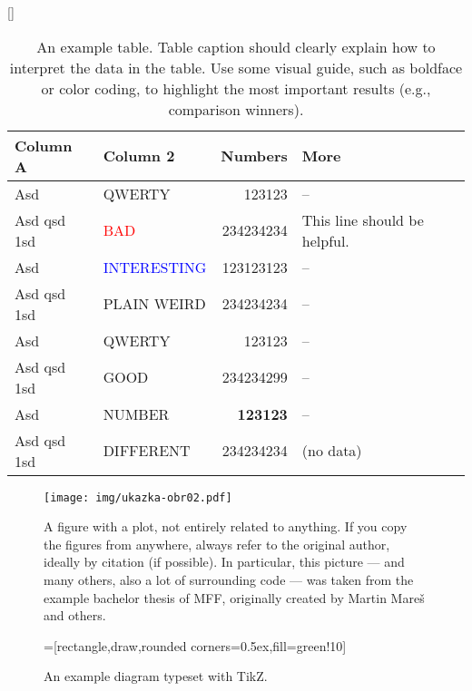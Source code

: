 \begin{table}
[\FBwidth]
{\centering\footnotesize\sf
\begin{tabular}{llrl}
\toprule
Column A & Column 2 & Numbers & More \\
\midrule
Asd & QWERTY & 123123 & -- \\
Asd qsd 1sd & \textcolor{red}{BAD} & 234234234 & This line should be helpful. \\
Asd & \textcolor{blue}{INTERESTING} & 123123123 & -- \\
Asd qsd 1sd & \textcolor{violet!50}{PLAIN WEIRD} & 234234234 & -- \\
Asd & QWERTY & 123123 & -- \\
\addlinespace %
Asd qsd 1sd & \textcolor{green!80!black}{GOOD} & 234234299 & -- \\
Asd & NUMBER & \textbf{123123} & -- \\
Asd qsd 1sd & DIFFERENT & 234234234 & (no data) \\
\bottomrule
\end{tabular}}
{\caption{An example table. Table caption should clearly explain how to interpret the data in the table. Use some visual guide, such as boldface or color coding, to highlight the most important results (e.g., comparison winners).}}
\label{tab:z}
\end{table}

\begin{figure}
\centering
\texttt{[image: img/ukazka-obr02.pdf]}
\caption{A figure with a plot, not entirely related to anything. If you copy the figures from anywhere, always refer to the original author, ideally by citation (if possible). In particular, this picture --- and many others, also a lot of surrounding code --- was taken from the example bachelor thesis of MFF, originally created by Martin Mareš and others.}
\label{fig:g}
\end{figure}

\begin{figure}
\centering
{}=[rectangle,draw,rounded corners=0.5ex,fill=green!10]
\caption{An example diagram typeset with TikZ.}
\label{fig:schema}
\end{figure}


